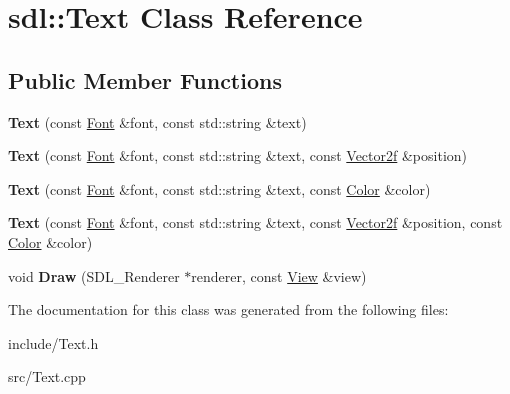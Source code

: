 \hypertarget{classsdl_1_1Text}{\section{sdl\-:\-:Text Class Reference}
\label{classsdl_1_1Text}
}
\subsection*{Public Member Functions}
\begin{DoxyCompactItemize}
\item 
\hypertarget{classsdl_1_1Text_a228c7142e4eb8e19966b75ab5a4bfe8e}{{\bfseries Text} (const \hyperlink{classsdl_1_1Font}{Font} \&font, const std\-::string \&text)}\label{classsdl_1_1Text_a228c7142e4eb8e19966b75ab5a4bfe8e}

\item 
\hypertarget{classsdl_1_1Text_a95b97704e932bb411da13475d9560f46}{{\bfseries Text} (const \hyperlink{classsdl_1_1Font}{Font} \&font, const std\-::string \&text, const \hyperlink{classsdl_1_1Vector2f}{Vector2f} \&position)}\label{classsdl_1_1Text_a95b97704e932bb411da13475d9560f46}

\item 
\hypertarget{classsdl_1_1Text_ac3c96ec47b00c2afa253f28798bd7db5}{{\bfseries Text} (const \hyperlink{classsdl_1_1Font}{Font} \&font, const std\-::string \&text, const \hyperlink{classsdl_1_1Color}{Color} \&color)}\label{classsdl_1_1Text_ac3c96ec47b00c2afa253f28798bd7db5}

\item 
\hypertarget{classsdl_1_1Text_a68dc953f492be950a05d46e0c4ed68c5}{{\bfseries Text} (const \hyperlink{classsdl_1_1Font}{Font} \&font, const std\-::string \&text, const \hyperlink{classsdl_1_1Vector2f}{Vector2f} \&position, const \hyperlink{classsdl_1_1Color}{Color} \&color)}\label{classsdl_1_1Text_a68dc953f492be950a05d46e0c4ed68c5}

\item 
\hypertarget{classsdl_1_1Text_a287aea175632a49ba9b1488da8c5bfed}{void {\bfseries Draw} (S\-D\-L\-\_\-\-Renderer $\ast$renderer, const \hyperlink{classsdl_1_1View}{View} \&view)}\label{classsdl_1_1Text_a287aea175632a49ba9b1488da8c5bfed}

\end{DoxyCompactItemize}


The documentation for this class was generated from the following files\-:\begin{DoxyCompactItemize}
\item 
include/Text.\-h\item 
src/Text.\-cpp\end{DoxyCompactItemize}
